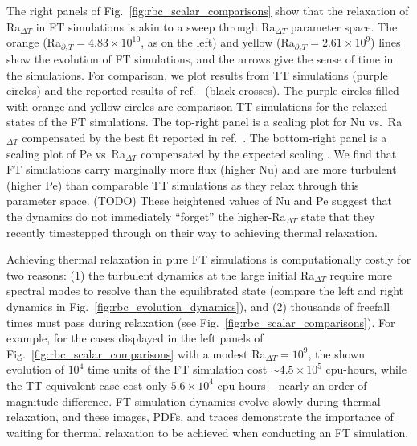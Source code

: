 \documentclass[aps, pre, onecolumn, nofootinbib, notitlepage, groupedaddress, amsfonts, amssymb, amsmath, longbibliography, superscriptaddress]{revtex4-1}
\newcommand{\ea}[1]{{\color{red} #1}}
\begin{document}
The right panels of Fig.~\ref{fig:rbc_scalar_comparisons} show that the relaxation of Ra$_{\Delta T}$ in FT simulations is akin to a sweep through Ra$_{\Delta T}$ parameter space.
The orange (Ra$_{\partial_z T} = 4.83 \times 10^{10}$, as on the left) and yellow (Ra$_{\partial_z T} = 2.61 \times 10^{9}$) lines show the evolution of FT simulations, and the arrows give the sense of time in the simulations.
For comparison, we plot results from TT simulations (purple circles) and the reported results of ref.~\cite{zhu&all2018} (black crosses).
The purple circles filled with orange and yellow circles are comparison TT simulations for the relaxed states of the FT simulations.
The top-right panel is a scaling plot for Nu vs.~Ra$_{\Delta T}$ compensated by the best fit reported in ref.~\cite{johnston&doering2009}.
The bottom-right panel is a scaling plot of Pe vs~Ra$_{\Delta T}$ compensated by the expected scaling \cite{ahlers&all2009}.
We find that FT simulations carry marginally more flux (higher Nu) and are more turbulent (higher Pe) than comparable TT simulations as they relax through this parameter space.
\ea{(TODO)}
These heightened values of Nu and Pe suggest that the dynamics do not immediately ``forget'' the higher-Ra$_{\Delta T}$ state that they recently timestepped through on their way to achieving thermal relaxation.

Achieving thermal relaxation in pure FT simulations is computationally costly for two reasons: (1) the turbulent dynamics at the large initial Ra$_{\Delta T}$ require more spectral modes to resolve than the equilibrated state (compare the left and right dynamics in Fig.~\ref{fig:rbc_evolution_dynamics}), and (2) thousands of freefall times must pass during relaxation (see Fig.~\ref{fig:rbc_scalar_comparisons}).
For example, for the cases displayed in the left panels of Fig.~\ref{fig:rbc_scalar_comparisons} with a modest Ra$_{\Delta T} = 10^9$, the shown evolution of $10^4$ time units of the FT simulation cost $\sim 4.5 \times 10^5$ cpu-hours, while the TT equivalent case cost only $5.6 \times 10^4$ cpu-hours -- nearly an order of magnitude difference.
FT simulation dynamics evolve slowly during thermal relaxation, and these images, PDFs, and traces demonstrate the importance of waiting for thermal relaxation to be achieved when conducting an FT simulation.
\end{document}
